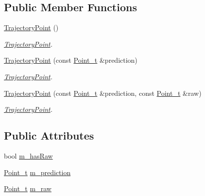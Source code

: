 \subsection*{Public Member Functions}
\begin{DoxyCompactItemize}
\item 
\mbox{\hyperlink{struct_trajectory_point_a6880ea8ab699f81587357df0dff311af}{Trajectory\+Point}} ()
\begin{DoxyCompactList}\small\item\em \mbox{\hyperlink{struct_trajectory_point}{Trajectory\+Point}}. \end{DoxyCompactList}\item 
\mbox{\hyperlink{struct_trajectory_point_a7d20d67a7ee073e2536e6ccbbaae1afa}{Trajectory\+Point}} (const \mbox{\hyperlink{defines_8h_a8c42696da8f098b91374a8e8bb84b430}{Point\+\_\+t}} \&prediction)
\begin{DoxyCompactList}\small\item\em \mbox{\hyperlink{struct_trajectory_point}{Trajectory\+Point}}. \end{DoxyCompactList}\item 
\mbox{\hyperlink{struct_trajectory_point_ae7b2bd691827713c879b04824a60ec03}{Trajectory\+Point}} (const \mbox{\hyperlink{defines_8h_a8c42696da8f098b91374a8e8bb84b430}{Point\+\_\+t}} \&prediction, const \mbox{\hyperlink{defines_8h_a8c42696da8f098b91374a8e8bb84b430}{Point\+\_\+t}} \&raw)
\begin{DoxyCompactList}\small\item\em \mbox{\hyperlink{struct_trajectory_point}{Trajectory\+Point}}. \end{DoxyCompactList}\end{DoxyCompactItemize}
\subsection*{Public Attributes}
\begin{DoxyCompactItemize}
\item 
bool \mbox{\hyperlink{struct_trajectory_point_aedf0113745aff30b359a60401ddcf076}{m\+\_\+has\+Raw}}
\item 
\mbox{\hyperlink{defines_8h_a8c42696da8f098b91374a8e8bb84b430}{Point\+\_\+t}} \mbox{\hyperlink{struct_trajectory_point_a967909b451c226e4927a2b96fcecbb6e}{m\+\_\+prediction}}
\item 
\mbox{\hyperlink{defines_8h_a8c42696da8f098b91374a8e8bb84b430}{Point\+\_\+t}} \mbox{\hyperlink{struct_trajectory_point_abb88f38dcc0abe8f428421a9fbf6a839}{m\+\_\+raw}}
\end{DoxyCompactItemize}


